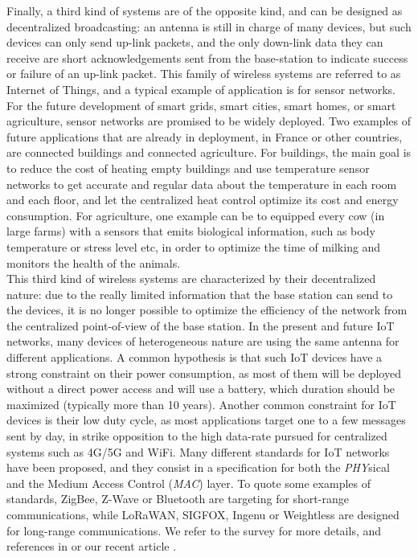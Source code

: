 Finally, a third kind of systems are of the opposite kind, and can be designed as decentralized broadcasting: an antenna is still in charge of many devices, but such devices can only send up-link packets, and the only down-link data they can receive are short acknowledgements sent from the base-station to indicate success or failure of an up-link packet.
This family of wireless systems are referred to as Internet of Things,
and a typical example of application is for sensor networks.\\
\indent
For the future development of smart grids, smart cities, smart homes, or smart agriculture, sensor networks are promised to be widely deployed.
Two examples of future applications that are already in deployment, in France or other countries, are connected buildings and connected agriculture.
For buildings, the main goal is to reduce the cost of heating empty buildings and use temperature sensor networks to get accurate and regular data about the temperature in each room and each floor, and let the centralized heat control optimize its cost and energy consumption.
For agriculture, one example can be to equipped every cow (in large farms) with a sensors that emits biological information, such as body temperature or stress level etc, in order to optimize the time of milking and monitors the health of the animals.\\
%
\indent
This third kind of wireless systems are characterized by their decentralized nature: due to the really limited information that the base station can send to the devices, it is no longer possible to optimize the efficiency of the network from the centralized point-of-view of the base station.
In the present and future IoT networks, many devices of heterogeneous nature are using the same antenna for different applications.
A common hypothesis is that such IoT devices have a strong constraint on their power consumption, as most of them will be deployed without a direct power access and will use a battery, which duration should be maximized (typically more than 10 years).
Another common constraint for IoT devices is their low duty cycle, as most applications target one to a few messages sent by day, in strike opposition to the high data-rate pursued for centralized systems such as 4G/5G and WiFi.
%
Many different standards for IoT networks have been proposed,
and they consist in a specification for both the \emph{PHY}sical
and the Medium Access Control (\emph{MAC}) layer.
To quote some examples of standards, ZigBee, Z-Wave or Bluetooth are targeting for short-range communications, while LoRaWAN, SIGFOX, Ingenu or Weightless are designed for long-range communications.
We refer to the survey \cite{Centenaro16} for more details, and references in \cite{Azari18} or our recent article \cite{MoyBesson2019}.

